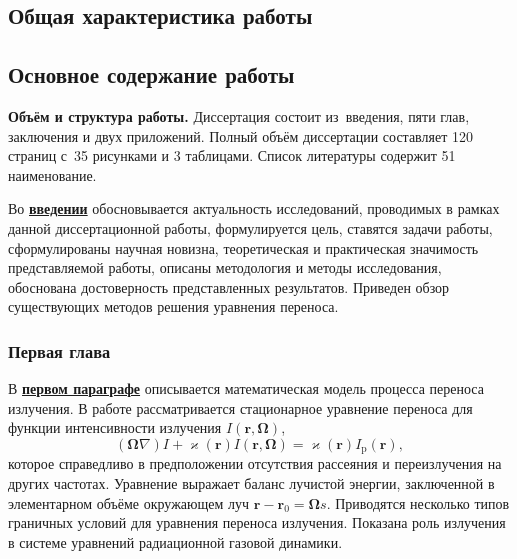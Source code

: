 \subsection*{Общая характеристика работы}


\newcommand{\contribution}{{\textbf{Личный вклад автора в публикации с соавторами.}}}


\newcommand{\epar}[1]{\underline{\textbf{#1}}}

\subsection*{Основное содержание работы}
\textbf{Объём и структура работы.} Диссертация состоит из~введения, пяти глав, заключения и двух приложений. Полный объём диссертации составляет 120 страниц
с~35 рисунками и 3 таблицами. Список литературы содержит 51 наименование.

Во \epar{введении} обосновывается актуальность исследований, проводимых в рамках данной диссертационной работы, формулируется цель, ставятся задачи работы, сформулированы научная новизна, теоретическая и практическая значимость представляемой работы, описаны методология и методы исследования, обоснована достоверность представленных результатов. Приведен обзор существующих методов решения уравнения переноса.


\subsubsection*{Первая глава}
В \epar{первом параграфе} описывается математическая модель процесса переноса излучения. 
В работе рассматривается стационарное уравнение переноса для функции интенсивности излучения
$I(\mathbf r, \boldsymbol \Omega)$, 
\[
(\boldsymbol \Omega  \nabla) I + \varkappa(\mathbf r) I(\mathbf r, \boldsymbol \Omega) = \varkappa(\mathbf r) I_\text{p}(\mathbf r),
\]
которое справедливо в предположении отсутствия рассеяния и переизлучения на других частотах. Уравнение выражает баланс лучистой энергии, заключенной в элементарном объёме окружающем луч $\mathbf r - \mathbf r_0 = \boldsymbol \Omega s$. Приводятся несколько типов граничных условий для уравнения переноса излучения. Показана роль излучения в системе уравнений радиационной газовой динамики. 

